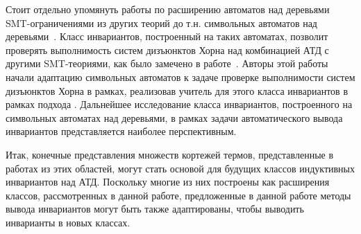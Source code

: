 Стоит отдельно упомянуть работы по расширению автоматов над деревьями SMT-ограничениями из других теорий до т.н. символьных автоматов над деревьями~\cite{VEANES2015418,10.1145/2933575.2933578}. Класс инвариантов, построенный на таких автоматах, позволит проверять выполнимость систем дизъюнктов Хорна над комбинацией АТД с другими SMT-теориями, как было замечено в работе~\cite{10.1007/978-3-031-13188-2_13}. Авторы этой работы начали адаптацию символьных автоматов к задаче проверке выполнимости систем дизъюнктов Хорна в рамках, реализовав учитель для этого класса инвариантов в рамках подхода \ice{}. Дальнейшее исследование класса инвариантов, построенного на символьных автоматах над деревьями, в рамках задачи автоматического вывода инвариантов представляется наиболее перспективным.

Итак, конечные представления множеств кортежей термов, представленные в работах из этих областей, могут стать основой для будущих классов индуктивных инвариантов над АТД. Поскольку многие из них построены как расширения классов, рассмотренных в данной работе, предложенные в данной работе методы вывода инвариантов могут быть также адаптированы, чтобы выводить инварианты в новых классах.
